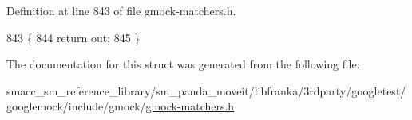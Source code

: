 Definition at line 843 of file gmock-\/matchers.\+h.


\begin{DoxyCode}
843                                                                  \{
844       \textcolor{keywordflow}{return} out;
845     \}
\end{DoxyCode}


The documentation for this struct was generated from the following file\+:\begin{DoxyCompactItemize}
\item 
smacc\+\_\+sm\+\_\+reference\+\_\+library/sm\+\_\+panda\+\_\+moveit/libfranka/3rdparty/googletest/googlemock/include/gmock/\hyperlink{gmock-matchers_8h}{gmock-\/matchers.\+h}\end{DoxyCompactItemize}
